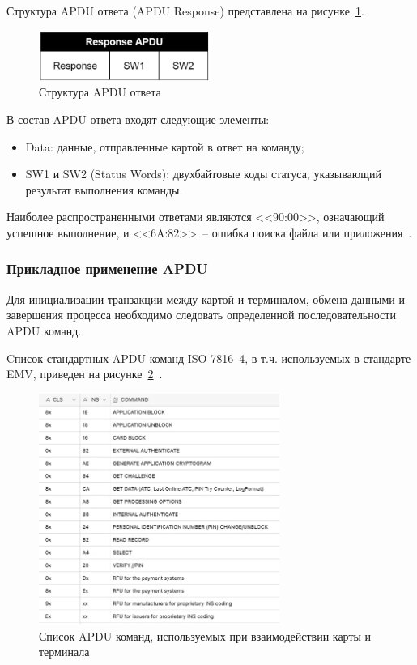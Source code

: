 Структура APDU ответа (APDU Response) представлена на рисунке~\ref{fig:apdu_resp}.

\begin{figure}[H]
    \centering
    \includegraphics[width=0.5\textwidth]{images/research/apdu_resp}
    \caption{\centering Структура APDU ответа}
    \label{fig:apdu_resp}
\end{figure}

В состав APDU ответа входят следующие элементы:

\begin{itemize}
    \item Data: данные, отправленные картой в ответ на команду;
    \item SW1 и SW2 (Status Words): двухбайтовые коды статуса, указывающий результат выполнения команды.
\end{itemize}

Наиболее распространенными ответами являются <<90:00>>, означающий успешное выполнение, и <<6A:82>>~-- ошибка поиска файла или приложения~\cite{iso7816-4}.


\subsubsection{Прикладное применение APDU}

Для инициализации транзакции между картой и терминалом, обмена данными и завершения процесса необходимо следовать определенной последовательности APDU команд.

Cписок стандартных APDU команд ISO 7816--4, в т.ч. используемых в стандарте EMV, приведен на рисунке~\ref{fig:apdu_commands}~\cite{iso7816-4}.

\begin{figure}[H]
    \centering
    \includegraphics[width=0.7\textwidth]{images/research/apdu_commands}
    \caption{\centering Список APDU команд, используемых при взаимодействии карты и терминала}
    \label{fig:apdu_commands}
\end{figure}

